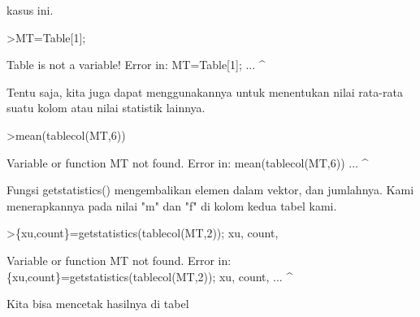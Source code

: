 \documentclass[a4paper,10pt]{article}
\begin{document}
\begin{eulernotebook}
\begin{eulercomment}
\begin{eulercomment}
\begin{eulercomment}
\begin{eulercomment}
\begin{eulercomment}
\begin{eulercomment}
\begin{eulercomment}
\begin{eulercomment}
\begin{eulercomment}
\begin{eulercomment}
\begin{eulercomment}
\begin{eulercomment}
\begin{eulercomment}
\begin{eulercomment}
\begin{eulercomment}
\begin{eulercomment}
\begin{eulercomment}
\begin{eulercomment}
\begin{eulercomment}
\begin{eulercomment}
\begin{eulercomment}
\begin{eulercomment}
\begin{eulercomment}
\begin{eulercomment}
\begin{eulercomment}
\begin{eulercomment}
\begin{eulercomment}
\begin{eulercomment}
\begin{eulercomment}
\begin{eulercomment}
\begin{eulercomment}
\begin{eulercomment}
\begin{eulercomment}
\begin{eulercomment}
\begin{eulercomment}
\begin{eulercomment}
\begin{eulercomment}
\begin{eulercomment}
\begin{eulercomment}
\begin{eulercomment}
\begin{eulercomment}
\begin{eulercomment}
\begin{eulercomment}
\begin{eulercomment}
\begin{eulercomment}
\begin{eulercomment}
\begin{eulercomment}
\begin{eulercomment}
\begin{eulercomment}
\begin{eulercomment}
\begin{eulercomment}
\begin{eulercomment}
\begin{eulercomment}
\begin{eulercomment}
\begin{eulercomment}
\begin{eulercomment}
\begin{eulercomment}
\begin{eulercomment}
\begin{eulercomment}
\begin{eulercomment}
\begin{eulercomment}
\begin{eulercomment}
\begin{eulercomment}
\begin{eulercomment}
\begin{eulercomment}
\begin{eulercomment}
\begin{eulercomment}
kasus ini.
\end{eulercomment}
\begin{eulerprompt}
>MT=Table[1];
\end{eulerprompt}
\begin{euleroutput}
  Table is not a variable!
  Error in:
  MT=Table[1]; ...
             ^
\end{euleroutput}
\begin{eulercomment}
Tentu saja, kita juga dapat menggunakannya untuk menentukan nilai
rata-rata suatu kolom atau nilai statistik lainnya.
\end{eulercomment}
\begin{eulerprompt}
>mean(tablecol(MT,6))
\end{eulerprompt}
\begin{euleroutput}
  Variable or function MT not found.
  Error in:
  mean(tablecol(MT,6)) ...
                  ^
\end{euleroutput}
\begin{eulercomment}
Fungsi getstatistics() mengembalikan elemen dalam vektor, dan
jumlahnya. Kami menerapkannya pada nilai "m" dan "f" di kolom kedua
tabel kami.
\end{eulercomment}
\begin{eulerprompt}
>\{xu,count\}=getstatistics(tablecol(MT,2)); xu, count,
\end{eulerprompt}
\begin{euleroutput}
  Variable or function MT not found.
  Error in:
  \{xu,count\}=getstatistics(tablecol(MT,2)); xu, count, ...
                                      ^
\end{euleroutput}
\begin{eulercomment}
Kita bisa mencetak hasilnya di tabel 
\end{eulercomment}
\end{eulercomment}
\end{eulercomment}
\end{eulercomment}
\end{eulercomment}
\end{eulercomment}
\end{eulercomment}
\end{eulercomment}
\end{eulercomment}
\end{eulercomment}
\end{eulercomment}
\end{eulercomment}
\end{eulercomment}
\end{eulercomment}
\end{eulercomment}
\end{eulercomment}
\end{eulercomment}
\end{eulercomment}
\end{eulercomment}
\end{eulercomment}
\end{eulercomment}
\end{eulercomment}
\end{eulercomment}
\end{eulercomment}
\end{eulercomment}
\end{eulercomment}
\end{eulercomment}
\end{eulercomment}
\end{eulercomment}
\end{eulercomment}
\end{eulercomment}
\end{eulercomment}
\end{eulercomment}
\end{eulercomment}
\end{eulercomment}
\end{eulercomment}
\end{eulercomment}
\end{eulercomment}
\end{eulercomment}
\end{eulercomment}
\end{eulercomment}
\end{eulercomment}
\end{eulercomment}
\end{eulercomment}
\end{eulercomment}
\end{eulercomment}
\end{eulercomment}
\end{eulercomment}
\end{eulercomment}
\end{eulercomment}
\end{eulercomment}
\end{eulercomment}
\end{eulercomment}
\end{eulercomment}
\end{eulercomment}
\end{eulercomment}
\end{eulercomment}
\end{eulercomment}
\end{eulercomment}
\end{eulercomment}
\end{eulercomment}
\end{eulercomment}
\end{eulercomment}
\end{eulercomment}
\end{eulercomment}
\end{eulercomment}
\end{eulercomment}
\end{eulernotebook}
\end{document}
